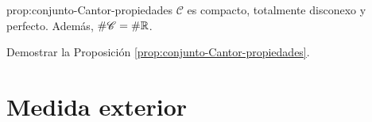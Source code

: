  \begin{proposicion}{prop:conjunto-Cantor-propiedades}
 $\mathscr{C}$ es compacto, totalmente disconexo y perfecto. 
 Adem\'as, $\# \mathscr{C}=\# \mathbb{R}$.
 \end{proposicion}
 
 \begin{ejercicio}{}
 Demostrar la Proposici\'on \ref{prop:conjunto-Cantor-propiedades}.
 \end{ejercicio}
 
 \section{Medida exterior}